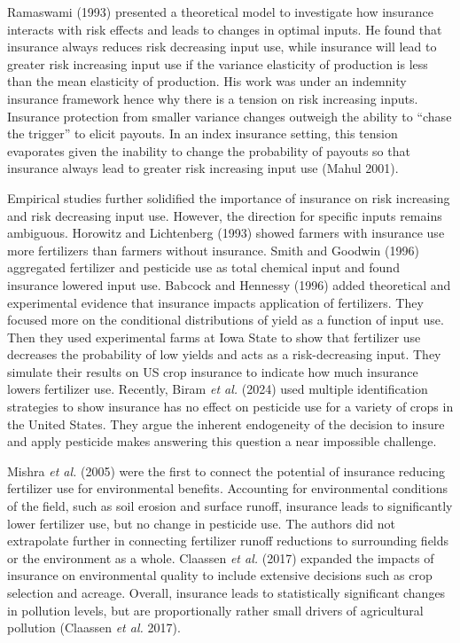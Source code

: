 \documentclass[
  letterpaper,
  DIV=11,
  numbers=noendperiod]{scrartcl}
\theoremstyle{plain}
\theoremstyle{plain}
\theoremstyle{remark}
\begin{document}
Ramaswami (1993) presented a theoretical model to investigate how
insurance interacts with risk effects and leads to changes in optimal
inputs. He found that insurance always reduces risk decreasing input
use, while insurance will lead to greater risk increasing input use if
the variance elasticity of production is less than the mean elasticity
of production. His work was under an indemnity insurance framework hence
why there is a tension on risk increasing inputs. Insurance protection
from smaller variance changes outweigh the ability to ``chase the
trigger'' to elicit payouts. In an index insurance setting, this tension
evaporates given the inability to change the probability of payouts so
that insurance always lead to greater risk increasing input use (Mahul
2001).

Empirical studies further solidified the importance of insurance on risk
increasing and risk decreasing input use. However, the direction for
specific inputs remains ambiguous. Horowitz and Lichtenberg (1993)
showed farmers with insurance use more fertilizers than farmers without
insurance. Smith and Goodwin (1996) aggregated fertilizer and pesticide
use as total chemical input and found insurance lowered input use.
Babcock and Hennessy (1996) added theoretical and experimental evidence
that insurance impacts application of fertilizers. They focused more on
the conditional distributions of yield as a function of input use. Then
they used experimental farms at Iowa State to show that fertilizer use
decreases the probability of low yields and acts as a risk-decreasing
input. They simulate their results on US crop insurance to indicate how
much insurance lowers fertilizer use. Recently, Biram \emph{et al.}
(2024) used multiple identification strategies to show insurance has no
effect on pesticide use for a variety of crops in the United States.
They argue the inherent endogeneity of the decision to insure and apply
pesticide makes answering this question a near impossible challenge.

Mishra \emph{et al.} (2005) were the first to connect the potential of
insurance reducing fertilizer use for environmental benefits. Accounting
for environmental conditions of the field, such as soil erosion and
surface runoff, insurance leads to significantly lower fertilizer use,
but no change in pesticide use. The authors did not extrapolate further
in connecting fertilizer runoff reductions to surrounding fields or the
environment as a whole. Claassen \emph{et al.} (2017) expanded the
impacts of insurance on environmental quality to include extensive
decisions such as crop selection and acreage. Overall, insurance leads
to statistically significant changes in pollution levels, but are
proportionally rather small drivers of agricultural pollution (Claassen
\emph{et al.} 2017).
\end{document}
